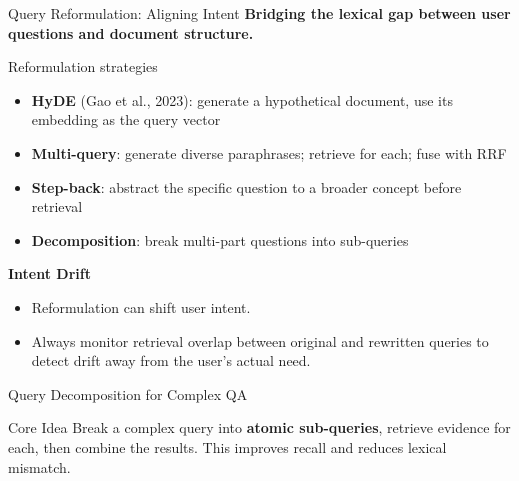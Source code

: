 \documentclass[aspectratio=169, xcolor=table]{beamer}
\newif\ifanimated
\newcommand{\cpause}{\ifanimated\pause\fi}
\begin{document}
\begin{frame}[shrink=10]{Query Reformulation: Aligning Intent}
\textbf{Bridging the lexical gap between user questions and document structure.}

\vspace{0.8em}
\begin{block}{Reformulation strategies}
\begin{itemize}
  \item \textbf{HyDE} (Gao et al., 2023): generate a hypothetical document,
    use its embedding as the query vector
  \item \textbf{Multi-query}: generate diverse paraphrases; retrieve for each;
    fuse with RRF
  \item \textbf{Step-back}: abstract the specific question to a broader concept
    before retrieval
  \item \textbf{Decomposition}: break multi-part questions into sub-queries
\end{itemize}
\end{block}

\cpause
\textbf{Intent Drift}
\begin{itemize}
  \item Reformulation can shift user intent.
  \item Always monitor retrieval overlap between original and rewritten queries to detect drift away from the user's actual need.
\end{itemize}
\end{frame}


\begin{frame}{Query Decomposition for Complex QA}
\begin{block}{Core Idea}
Break a complex query into \textbf{atomic sub-queries}, retrieve evidence for each, then combine the results.
This improves recall and reduces lexical mismatch.
\end{block}

\vspace{0.8em}
\begin{center}
\end{center}
\end{frame}
\end{document}

